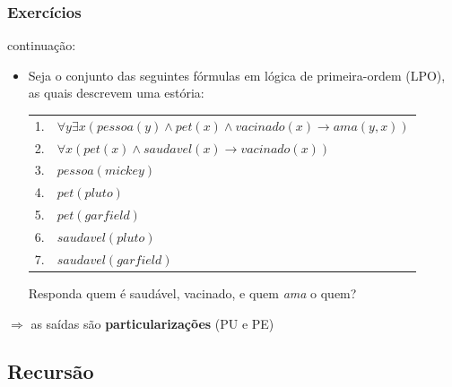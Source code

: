 \documentclass[10pt]{beamer}
\begin{document}
\begin{frame}[fragile]%
 \frametitle{Exercícios}

\begin{block}{continuação:}

\begin{itemize}

\item Seja o conjunto das seguintes fórmulas em lógica de primeira-ordem (LPO), as quais descrevem uma estória:
\begin{small}

\begin{tabular}{ll}
 \hline \hline
    1. &  $\forall y \exists x ( pessoa(y) \wedge pet(x) \wedge vacinado(x) \rightarrow ama(y, x) )$ \\
    2. &  $ \forall x ( pet(x) \wedge saudavel(x) \rightarrow vacinado(x) ) $ \\
    3. &  $ pessoa(mickey) $ \\
    4. &  $ pet(pluto) $ \\
    5. &  $ pet(garfield) $ \\
    6. &  $ saudavel(pluto)$ \\
    7. &  $ saudavel(garfield)$ \\
    \hline \hline
 \end{tabular}
Responda quem é saudável, vacinado, e quem \textit{ama} o quem?

\end{small}
\end{itemize}

\end{block}

   $\Rightarrow $ as saídas são \textbf{particularizações} (PU e PE)
 
\end{frame}

\subsection{Recursão}
\end{document}
